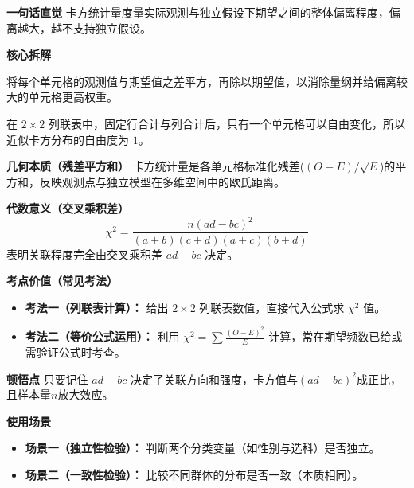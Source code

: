 \begin{explanationbox}
	\textbf{\textcolor{CExplanation}{一句话直觉}}
	卡方统计量度量实际观测与独立假设下期望之间的整体偏离程度，偏离越大，越不支持独立假设。

	\medskip
	\textbf{\textcolor{CExplanation}{核心拆解}}
	\begin{description}[style=nextline, leftmargin=2.8em, labelsep=0.5em, itemsep=0.45em]
		\item[\textbf{要点一（构造思想）：}]
			将每个单元格的观测值与期望值之差平方，再除以期望值，以消除量纲并给偏离较大的单元格更高权重。
		\item[\textbf{要点二（自由度意义）：}]
			在 $2\times2$ 列联表中，固定行合计与列合计后，只有一个单元格可以自由变化，所以近似卡方分布的自由度为 $1$。
	\end{description}

	\medskip
	\textbf{\textcolor{CExplanation}{几何本质（残差平方和）}}
	卡方统计量是各单元格标准化残差($(O-E)/\sqrt{E}$)的平方和，反映观测点与独立模型在多维空间中的欧氏距离。

	\medskip
	\textbf{\textcolor{CExplanation}{代数意义（交叉乘积差）}}
	\[
		\chi^2 = \frac{n(ad-bc)^2}{(a+b)(c+d)(a+c)(b+d)}
	\]
	表明关联程度完全由交叉乘积差 $ad-bc$ 决定。

	\medskip
	\textbf{\textcolor{CExplanation}{考点价值（常见考法）}}
	\begin{itemize}[leftmargin=*, itemsep=0.5em, topsep=0.4em]
		\item \textbf{考法一（列联表计算）：} 给出 $2\times2$ 列联表数值，直接代入公式求 $\chi^2$ 值。
		\item \textbf{考法二（等价公式运用）：} 利用 $\chi^2=\sum\frac{(O-E)^2}{E}$ 计算，常在期望频数已给或需验证公式时考查。
	\end{itemize}

	\medskip
	\textbf{\textcolor{CExplanation}{顿悟点}}
	只要记住 $ad-bc$ 决定了关联方向和强度，卡方值与$(ad-bc)^2$成正比，且样本量$n$放大效应。

	\medskip
	\textbf{\textcolor{CExplanation}{使用场景}}
	\begin{itemize}[leftmargin=*, itemsep=0.5em, topsep=0.4em]
		\item \textbf{场景一（独立性检验）：} 判断两个分类变量（如性别与选科）是否独立。
		\item \textbf{场景二（一致性检验）：} 比较不同群体的分布是否一致（本质相同）。
	\end{itemize}

\end{explanationbox}
